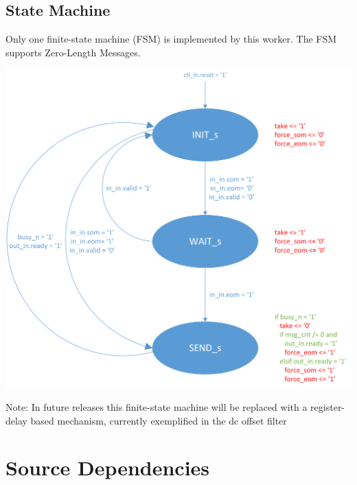 \documentclass{article}
\begin{document}
\subsection*{State Machine}
\begin{flushleft}
	Only one finite-state machine (FSM) is implemented by this worker. The FSM supports Zero-Length Messages.
\end{flushleft}
{\centering\captionsetup{type=figure}\includegraphics[scale=0.7]{zlm_fsm}\par{}\label{fig:zlm_fsm}}
\begin{flushleft}
        Note: In future releases this finite-state machine will be replaced with a register-delay based mechanism, currently exemplified in the dc offset filter
\end{flushleft}

\newpage

\section*{Source Dependencies}
\end{document}
